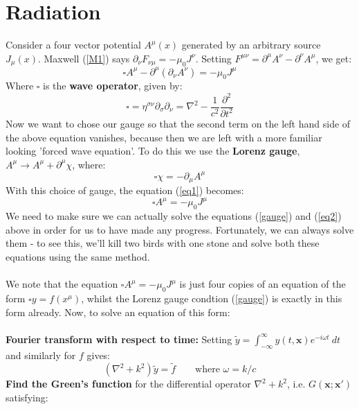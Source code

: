 \documentclass[a4paper]{article}
\numberwithin{equation}{section}
\begin{document}
\section{Radiation}
Consider a four vector potential $A^\mu(x)$ generated by an arbitrary source $J_\mu(x)$. Maxwell (\ref{M1}) says $\partial_\nu F_{\nu \mu} = -\mu_0J^\nu$. Setting $F^{\mu\nu}=\partial^\mu A^\nu - \partial^\nu A^\mu$, we get:
\begin{equation} \label{eq1}
\square A^\mu - \partial^\mu(\partial_\nu A^\nu) = -\mu_0 J^\mu
\end{equation} 
Where $\square$ is the \textbf{wave operator}, given by:
\begin{equation}
\square = \eta^{\sigma \nu}\partial_\sigma \partial_\nu = \nabla^2 - \frac{1}{c^2} \frac{\partial^2}{\partial t^2}
\end{equation}
Now we want to chose our gauge so that the second term on the left hand side of the above equation vanishes, because then we are left with a more familiar looking 'forced wave equation'. To do this we use the \textbf{Lorenz gauge}, $A^\mu \rightarrow A^\mu+\partial^\mu \chi$, where:
\begin{equation} \label{gauge}
\square \chi = -\partial_\mu A^\mu
\end{equation}
With this choice of gauge, the equation (\ref{eq1}) becomes:
\begin{equation} \label{eq2}
\square A^\mu = -\mu_0 J^\mu
\end{equation}
We need to make sure we can actually solve the equations (\ref{gauge}) and (\ref{eq2}) above in order for us to have made any progress. Fortunately, we can always solve them - to see this, we'll kill two birds with one stone and solve both these equations using the same method.\\
\\
We note that the equation $\square A^\mu = -\mu_0J^\mu$ is just four copies of an equation of the form $\square y = f(x^\mu)$, whilst the Lorenz gauge condtion (\ref{gauge}) is exactly in this form already. Now, to solve an equation of this form:\\
\\
\textbf{Fourier transform with respect to time:} Setting $\tilde{y} = \int_{-\infty}^{\infty}y(t,\mathbf{x})e^{-i \omega t} \ dt$ and similarly for $f$ gives:
\begin{equation}
(\nabla^2+k^2)\tilde{y} = \tilde{f} \qquad \text{where } \omega = k/c
\end{equation}
\textbf{Find the Green's function} for the differential operator $\nabla^2 + k^2$, i.e. $G(\bm{x};\bm{x}')$ satisfying:
\end{document}
